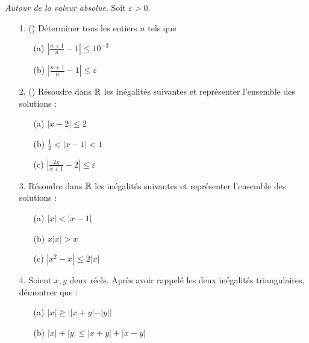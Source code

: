 \documentclass[solutions]{exercices}
\begin{document}
\begin{exercice}
	\textit{Autour de la valeur absolue}. Soit $\varepsilon > 0$.
	\begin{enumerate}
		\item[1.] (\di) Déterminer tous les entiers $n$ tels que
		      \begin{enumerate}
			      \item[(a)] $|\frac{n+1}{n} - 1| \leq 10^{-3}$
			      \item[(b)] $|\frac{n+1}{n} - 1| \leq \varepsilon$
		      \end{enumerate}
		\item[2.] (\di) Résoudre dans $\mathbb{R}$ les inégalités suivantes et représenter l'ensemble des solutions :
		      \begin{enumerate}
			      \item[(a)] $|x-2| \leq 2$
			      \item[(b)] $\frac{1}{2} < |x-1| < 1$
			      \item[(c)] $|\frac{2x}{x+1} - 2| \leq \varepsilon$
		      \end{enumerate}
		\item[3.] Résoudre dans $\mathbb{R}$ les inégalités suivantes et représenter l'ensemble des solutions :
		      \begin{enumerate}
			      \item[(a)] $|x| < |x-1|$
			      \item[(b)] $x|x| > x$
			      \item[(c)] $|x^2 - x| \leq 2|x|$
		      \end{enumerate}
		\item[4.] Soient $x, y$ deux réels. Après avoir rappelé les deux inégalités triangulaires, démontrer que :
		      \begin{enumerate}
			      \item[(a)] $|x| \geq ||x+y| - |y||$
			      \item[(b)] $|x| + |y| \leq |x+y| + |x-y|$
		      \end{enumerate}
	\end{enumerate}
\end{exercice}
\end{document}
